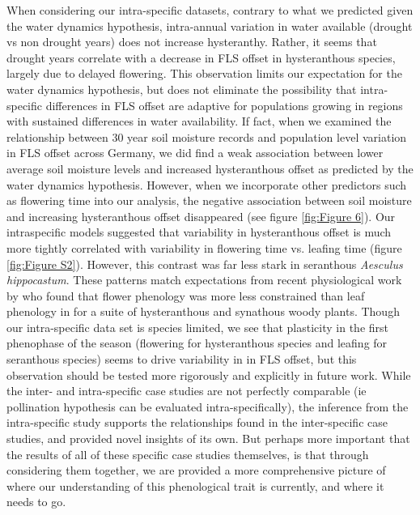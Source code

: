 \documentclass[12pt]{article}\usepackage[]{graphicx}\usepackage[]{color}
\begin{document}
\indent When considering our intra-specific datasets, contrary to what we predicted given the water dynamics hypothesis, intra-annual variation in water available (drought vs non drought years) does not increase hysteranthy. Rather, it seems that drought years correlate with a decrease in FLS offset in hysteranthous species, largely due to delayed flowering. This observation limits our expectation for the water dynamics hypothesis, but does not eliminate the possibility that intra-specific differences in FLS offset are adaptive for populations growing in regions with sustained differences in water availability. If fact, when we examined the relationship between 30 year soil moisture records and population level variation in FLS offset across Germany, we did find a weak association between lower average soil moisture levels and increased hysteranthous offset as predicted by the water dynamics hypothesis. However, when we incorporate other predictors such as flowering time into our analysis, the negative association between soil moisture and increasing hysteranthous offset disappeared (see figure \ref{fig:Figure 6}). Our intraspecific models suggested that variability in hysteranthous offset is much more tightly correlated with variability in flowering time vs. leafing time (figure \ref{fig:Figure S2}). However, this contrast was far less stark in seranthous \textit{Aesculus hippocastum}. These patterns match expectations from recent physiological work by \citet{Savage2019} who found that flower phenology was more less constrained than leaf phenology in for a suite of hysteranthous and synathous woody plants. Though our intra-specific data set is species limited, we see that plasticity in the first phenophase of the season (flowering for hysteranthous species and leafing for seranthous species) seems to drive variability in in FLS offset, but this observation should be tested more rigorously and explicitly in future work. While the inter- and intra-specific case studies are not perfectly comparable (ie pollination hypothesis can be evaluated intra-specifically), the inference from the intra-specific study supports the relationships found in the inter-specific case studies, and provided novel insights of its own. But perhaps more important that the results of all of these specific case studies themselves, is that through considering them together, we are provided a more comprehensive picture of where our understanding of this phenological trait is currently, and where it needs to go. 
\end{document}
